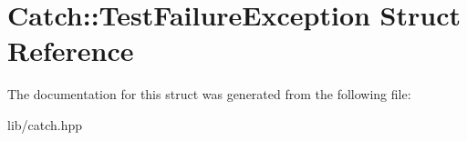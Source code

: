 \hypertarget{struct_catch_1_1_test_failure_exception}{}\section{Catch\+:\+:Test\+Failure\+Exception Struct Reference}
\label{struct_catch_1_1_test_failure_exception}


The documentation for this struct was generated from the following file\+:\begin{DoxyCompactItemize}
\item 
lib/catch.\+hpp\end{DoxyCompactItemize}
